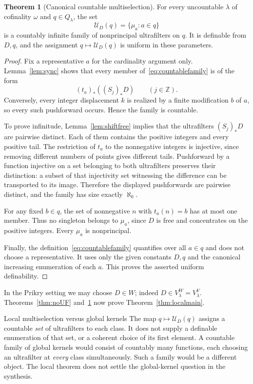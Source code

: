 \documentclass[11pt,letterpaper]{article}
\theoremstyle{definition}
\newtheorem{theorem}[definition]{Theorem}
\numberwithin{equation}{section}
\newcommand{\UU}{\mathcal U}
\begin{document}
\begin{theorem}[Canonical countable multiselection]\label{thm:countableUF}
For every uncountable $\lambda$ of cofinality $\omega$ and $q\in Q_\lambda$, the set
\begin{equation}\label{eq:countablefamily}
 \UU_D(q)=\{\mu_a:a\in q\}
\end{equation}
is a countably infinite family of nonprincipal ultrafilters on $q$. It is definable from $D,q$, and the assignment $q\mapsto\UU_D(q)$ is uniform in these parameters.
\end{theorem}
\begin{proof}
Fix a representative $a$ for the cardinality argument only. Lemma~\ref{lem:sync} shows that every member of~\eqref{eq:countablefamily} is of the form
\[
 (t_a)_*((S_j)_*D)\qquad(j\in\mathbb Z).
\]
Conversely, every integer displacement $k$ is realized by a finite modification $b$ of $a$, so every such pushforward occurs. Hence the family is countable.

To prove infinitude, Lemma~\ref{lem:shiftfree} implies that the ultrafilters $(S_j)_*D$ are pairwise distinct. Each of them contains the positive integers and every positive tail. The restriction of $t_a$ to the nonnegative integers is injective, since removing different numbers of points gives different tails. Pushforward by a function injective on a set belonging to both ultrafilters preserves their distinction: a subset of that injectivity set witnessing the difference can be transported to its image. Therefore the displayed pushforwards are pairwise distinct, and the family has size exactly $\aleph_0$.

For any fixed $b\in q$, the set of nonnegative $n$ with $t_a(n)=b$ has at most one member. Thus no singleton belongs to $\mu_a$, since $D$ is free and concentrates on the positive integers. Every $\mu_a$ is nonprincipal.

Finally, the definition~\eqref{eq:countablefamily} quantifies over all $a\in q$ and does not choose a representative. It uses only the given constants $D,q$ and the canonical increasing enumeration of each $a$. This proves the asserted uniform definability.
\end{proof}

In the Prikry setting we may choose $D\in W$; indeed $D\in V_\lambda^W=V_\lambda^V$. Theorems~\ref{thm:noUF} and~\ref{thm:countableUF} now prove Theorem~\ref{thm:localmain}.

\begin{assessment}{Local multiselection versus global kernels}
The map $q\mapsto\UU_D(q)$ assigns a countable \emph{set} of ultrafilters to each class. It does not supply a definable enumeration of that set, or a coherent choice of its first element. A countable family of global kernels would consist of countably many functions, each choosing an ultrafilter at \emph{every} class simultaneously. Such a family would be a different object. The local theorem does not settle the global-kernel question in the synthesis.
\end{assessment}
\end{document}
